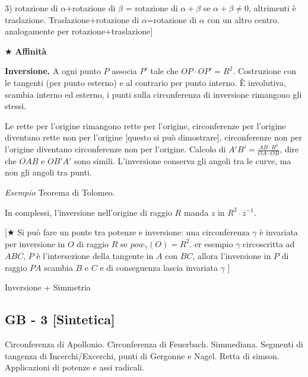 3) rotazione di $\alpha$+rotazione di $\beta$ = rotazione di $\alpha+\beta$ se $\alpha+\beta \neq 0$, altrimenti è traslazione. Traslazione+rotazione di $\alpha$=rotazione di $\alpha$ con un altro centro. analogamente per rotazione+traslazione]

\vspace{0.4cm}

$\bigstar$ \textbf{Affinità}

\vspace{0.4cm}

\textbf{Inversione.} A ogni punto $P$ associa $P'$ tale che $OP\cdot OP'=R^2$. Costruzione con le tangenti (per punto esterno) e al contrario per punto interno. È involutiva, scambia interno ed esterno, i punti sulla circonferenza di inversione rimangono gli stessi. 

Le rette per l'origine rimangono rette per l'origine, circonferenze per l'origine diventano rette non per l'origine [questo si può dimostrare], circonferenze non per l'origine diventano circonferenze non per l'origine. Calcolo di $A'B'=\frac{AB\cdot R^2}{OA \cdot OB}$, dire che $OAB$ e $OB'A'$ sono simili. L'inversione conserva gli angoli tra le curve, ma non gli angoli tra punti.

\textit{Esempio} Teorema di Tolomeo.

In complessi, l'inversione nell'origine di raggio $R$ manda $z$ in $R^2\cdot \overline{z}^{-1}$. 


[$\bigstar$ Si può fare un ponte tra potenze e inversione: una circonferenza $\gamma$ è invariata per inversione in $O$ di raggio $R$ se $pow_{\gamma}(O)=R^2$. er esempio $\gamma$ circoscritta ad $ABC$, $P$ è l'intersezione della tangente in $A$ con $BC$, allora l'inversione in $P$ di raggio $PA$ scambia $B$ e $C$ e di conseguenza lascia invariata $\gamma$ ]

\vspace{0.4cm}
Inversione + Simmetria


\subsection{GB - 3 [Sintetica]}
\begin{short}
 Circonferenza di Apollonio. Circonferenza di Feuerbach. Simmediana. Segmenti di tangenza di Incerchi/Excerchi, punti di Gergonne e Nagel. Retta di simson. Applicazioni di potenze e assi radicali. 
\end{short}




